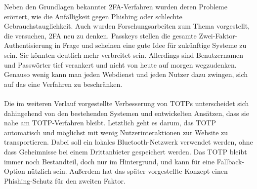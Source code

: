 Neben den Grundlagen bekannter 2FA-Verfahren wurden deren Probleme erörtert, wie die Anfälligkeit 
gegen Phishing oder schlechte Gebrauchstauglichkeit. Auch wurden Forschungsarbeiten zum Thema 
vorgestellt, die versuchen, 2FA neu zu denken. Passkeys stellen die gesamte 
Zwei-Faktor-Authentisierung in Frage und scheinen eine gute Idee für zukünftige Systeme zu sein. 
Sie könnten deutlich mehr verbreitet sein. Allerdings sind Benutzernamen und Passwörter tief 
verankert und nicht von heute auf morgen wegzudenken. Genauso wenig kann man jeden Webdienst und 
jeden Nutzer dazu zwingen, sich auf \glqq das eine Verfahren\grqq{} zu beschränken.
\\\\
Die im weiteren Verlauf vorgestellte Verbesserung von TOTPs unterscheidet sich dahingehend von 
den bestehenden Systemen und entwickelten Ansätzen, dass sie nahe am TOTP-Verfahren bleibt. 
Letztlich geht es darum, das TOTP automatisch und möglichst mit wenig Nutzerinteraktionen zur 
Website zu transportieren. Dabei soll ein lokales Bluetooth-Netzwerk verwendet werden, ohne dass 
Geheimnisse bei einem Drittanbieter gespeichert werden. Das TOTP bleibt immer noch Bestandteil, 
doch nur im Hintergrund, und kann für eine Fallback-Option nützlich sein. Außerdem hat das später 
vorgestellte Konzept einen Phishing-Schutz für den zweiten Faktor.